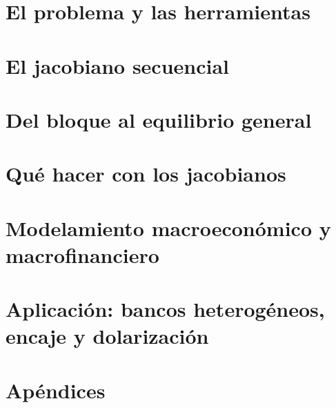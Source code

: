 \documentclass[11pt,openany]{report}
\begin{document}

\tableofcontents


\part{El problema y las herramientas}



\part{El jacobiano secuencial}





\part{Del bloque al equilibrio general}



\part{Qué hacer con los jacobianos}




\part{Modelamiento macroeconómico y macrofinanciero}



\part{Aplicación: bancos heterogéneos, encaje y dolarización}



\appendix
\part*{Apéndices}





\end{document}
